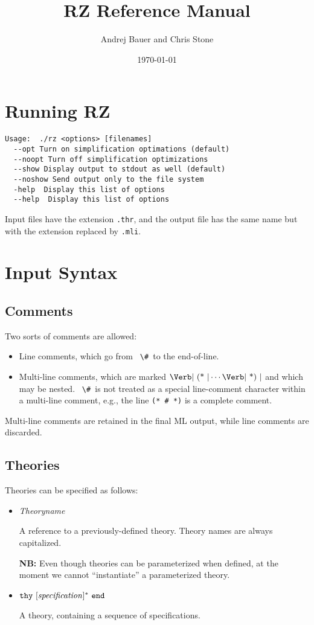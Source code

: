 \documentclass{article}
\title{RZ Reference Manual}
\date{\today}
\author{Andrej Bauer and Chris Stone}
\newcommand{\keywd}[1]{\mbox{\texttt{#1}}\xspace}
\newcommand{\END}{\keywd{end}}
\newcommand{\THY}{\keywd{thy}}
\newcommand{\metav}[1]{\mbox{\textit{#1}}\xspace}
\newcommand{\TIdentifier}{\metav{Theoryname}}
\newcommand{\Specification}{\metav{specification}}
\newcommand{\HASH}{\mbox{\Verb| \# |}}
\newcommand{\LCOMMENT}{\mbox{\Verb| (* |}}
\newcommand{\RCOMMENT}{\mbox{\Verb| *) |}}
\newcommand{\NB}{\textbf{NB: }}
\begin{document}
\maketitle

\section{Running RZ}

\begin{Verbatim}
Usage:  ./rz <options> [filenames]
  --opt Turn on simplification optimations (default)
  --noopt Turn off simplification optimizations
  --show Display output to stdout as well (default)
  --noshow Send output only to the file system
  -help  Display this list of options
  --help  Display this list of options
\end{Verbatim}

Input files have the extension \Verb|.thr|, and the 
output file has the same name but with the extension replaced by \Verb|.mli|.

\section{Input Syntax}

\subsection{Comments}

Two sorts of comments are allowed:
\begin{itemize}
\item Line comments, which go from \HASH to the end-of-line.
\item Multi-line comments, which are marked $\LCOMMENT \cdots
  \RCOMMENT$ and which may be nested.  \HASH is not treated as a
  special line-comment character within a multi-line comment, e.g.,
  the line \Verb|(* # *)| is a complete comment.
\end{itemize}

  Multi-line comments are retained in the final ML output, while line
  comments are discarded.

\subsection{Theories}

Theories can be specified as follows:
\begin{itemize}
\item \TIdentifier

   A reference to a previously-defined theory.  Theory names are always
   capitalized.
   
   \NB Even though theories can be parameterized when
     defined, at the moment we cannot ``instantiate'' a parameterized
     theory.

\item $\THY\ [\Specification]^*\ \END$

   A theory, containing a sequence of specifications.
\end{itemize}
\end{document}
